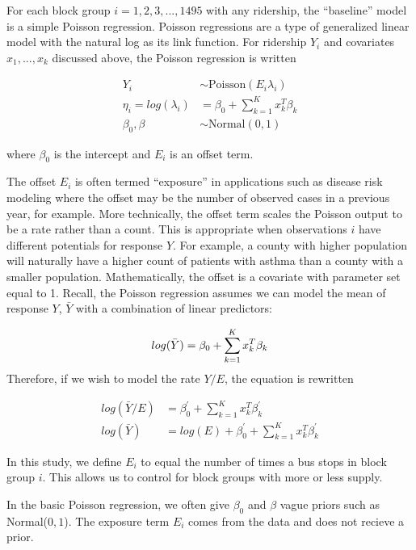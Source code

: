 \documentclass[]{article}
\begin{document}
For each block group \(i = 1, 2, 3, ..., 1495\) with any ridership, the
``baseline'' model is a simple Poisson regression. Poisson regressions
are a type of generalized linear model with the natural log as its link
function. For ridership \(Y_i\) and covariates \(x_1, ..., x_k\)
discussed above, the Poisson regression is written

\[
\begin{aligned}
Y_i & \sim \text{Poisson}(E_i\lambda_i) \\
\eta_i  = log(\lambda_i) & = \beta_0 + \sum_{k=1}^{K}x_k^T\beta_k \\
\beta_0, \beta &\sim \text{Normal}(0, 1)
\end{aligned}
\]

where \(\beta_0\) is the intercept and \(E_i\) is an offset term.

The offset \(E_i\) is often termed ``exposure'' in applications such as
disease risk modeling where the offset may be the number of observed
cases in a previous year, for example. More technically, the offset term
scales the Poisson output to be a rate rather than a count. This is
appropriate when observations \(i\) have different potentials for
response \(Y\). For example, a county with higher population will
naturally have a higher count of patients with asthma than a county with
a smaller population. Mathematically, the offset is a covariate with
parameter set equal to 1. Recall, the Poisson regression assumes we can
model the mean of response \(Y\), \(\bar{Y}\) with a combination of
linear predictors:

\[
log(\bar{Y}) = \beta_0 + \sum_{k=1}^{K}x_k^T\beta_k \\
\] Therefore, if we wish to model the rate \(Y/E\), the equation is
rewritten

\[
\begin{aligned}
log(\bar{Y}/E) & = \beta^{'}_0 + \sum_{k=1}^{K}x_k^T\beta^{'}_k \\
log(\bar{Y}) & = log(E) + \beta^{'}_0 + \sum_{k=1}^{K}x_k^T\beta^{'}_k
\end{aligned}
\]

In this study, we define \(E_i\) to equal the number of times a bus
stops in block group \(i\). This allows us to control for block groups
with more or less supply.

In the basic Poisson regression, we often give \(\beta_0\) and \(\beta\)
vague priors such as Normal(\(0, 1\)). The exposure term \(E_i\) comes
from the data and does not recieve a prior.
\end{document}

